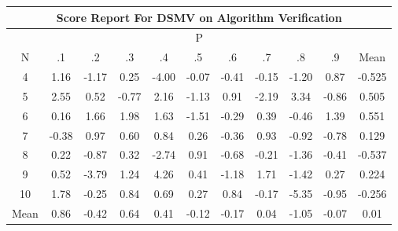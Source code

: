 \documentclass[11pt,a4paper]{report}
\begin{document}
\begin{longtable}{ | c || c | c | c | c | c | c | c | c | c || c |}
\hline
\multicolumn{11}{|c|}{ Score Report For DSMV on Algorithm Verification} \\
\hline
\multicolumn{11}{|c|}{ P } \\
\hline
N & .1 & .2 & .3 & .4 & .5 & .6 & .7 & .8 & .9 & Mean\\
 \hline
 \hline
 \endhead
  4 &  \cellcolor[HTML]{DFDFFF} 1.16 &  \cellcolor[HTML]{FFDFDF} -1.17 &  \cellcolor[HTML]{F7F7FF} 0.25 &  \cellcolor[HTML]{FF9797} -4.00 &  \cellcolor[HTML]{FFFFFF} -0.07 &  \cellcolor[HTML]{FFF7F7} -0.41 &  \cellcolor[HTML]{FFFFFF} -0.15 &  \cellcolor[HTML]{FFDFDF} -1.20 &  \cellcolor[HTML]{E7E7FF} 0.87 & -0.525 \\
  5 &  \cellcolor[HTML]{BFBFFF} 2.55 &  \cellcolor[HTML]{EFEFFF} 0.52 &  \cellcolor[HTML]{FFEFEF} -0.77 &  \cellcolor[HTML]{C7C7FF} 2.16 &  \cellcolor[HTML]{FFDFDF} -1.13 &  \cellcolor[HTML]{E7E7FF} 0.91 &  \cellcolor[HTML]{FFC7C7} -2.19 &  \cellcolor[HTML]{A7A7FF} 3.34 &  \cellcolor[HTML]{FFE7E7} -0.86 & 0.505 \\
  6 &  \cellcolor[HTML]{F7F7FF} 0.16 &  \cellcolor[HTML]{D7D7FF} 1.66 &  \cellcolor[HTML]{CFCFFF} 1.98 &  \cellcolor[HTML]{D7D7FF} 1.63 &  \cellcolor[HTML]{FFD7D7} -1.51 &  \cellcolor[HTML]{FFF7F7} -0.29 &  \cellcolor[HTML]{F7F7FF} 0.39 &  \cellcolor[HTML]{FFF7F7} -0.46 &  \cellcolor[HTML]{DFDFFF} 1.39 & 0.551 \\
  7 &  \cellcolor[HTML]{FFF7F7} -0.38 &  \cellcolor[HTML]{E7E7FF} 0.97 &  \cellcolor[HTML]{EFEFFF} 0.60 &  \cellcolor[HTML]{E7E7FF} 0.84 &  \cellcolor[HTML]{F7F7FF} 0.26 &  \cellcolor[HTML]{FFF7F7} -0.36 &  \cellcolor[HTML]{E7E7FF} 0.93 &  \cellcolor[HTML]{FFE7E7} -0.92 &  \cellcolor[HTML]{FFEFEF} -0.78 & 0.129 \\
  8 &  \cellcolor[HTML]{F7F7FF} 0.22 &  \cellcolor[HTML]{FFE7E7} -0.87 &  \cellcolor[HTML]{F7F7FF} 0.32 &  \cellcolor[HTML]{FFB7B7} -2.74 &  \cellcolor[HTML]{E7E7FF} 0.91 &  \cellcolor[HTML]{FFEFEF} -0.68 &  \cellcolor[HTML]{FFF7F7} -0.21 &  \cellcolor[HTML]{FFDFDF} -1.36 &  \cellcolor[HTML]{FFF7F7} -0.41 & -0.537 \\
  9 &  \cellcolor[HTML]{EFEFFF} 0.52 &  \cellcolor[HTML]{FF9F9F} -3.79 &  \cellcolor[HTML]{DFDFFF} 1.24 &  \cellcolor[HTML]{9797FF} 4.26 &  \cellcolor[HTML]{F7F7FF} 0.41 &  \cellcolor[HTML]{FFDFDF} -1.18 &  \cellcolor[HTML]{D7D7FF} 1.71 &  \cellcolor[HTML]{FFDFDF} -1.42 &  \cellcolor[HTML]{F7F7FF} 0.27 & 0.224 \\
  10 &  \cellcolor[HTML]{CFCFFF} 1.78 &  \cellcolor[HTML]{FFF7F7} -0.25 &  \cellcolor[HTML]{E7E7FF} 0.84 &  \cellcolor[HTML]{EFEFFF} 0.69 &  \cellcolor[HTML]{F7F7FF} 0.27 &  \cellcolor[HTML]{E7E7FF} 0.84 &  \cellcolor[HTML]{FFF7F7} -0.17 &  \cellcolor[HTML]{FF7878} -5.35 &  \cellcolor[HTML]{FFE7E7} -0.95 & -0.256 \\
 \hline
 \hline
Mean &  \cellcolor[HTML]{E7E7FF} 0.86 &  \cellcolor[HTML]{FFF7F7} -0.42 &  \cellcolor[HTML]{EFEFFF} 0.64 &  \cellcolor[HTML]{F7F7FF} 0.41 &  \cellcolor[HTML]{FFFFFF} -0.12 &  \cellcolor[HTML]{FFF7F7} -0.17 &  \cellcolor[HTML]{FFFFFF} 0.04 &  \cellcolor[HTML]{FFE7E7} -1.05 &  \cellcolor[HTML]{FFFFFF} -0.07 &  \cellcolor[HTML]{FFFFFF} 0.01
\end{longtable}
\end{document}
